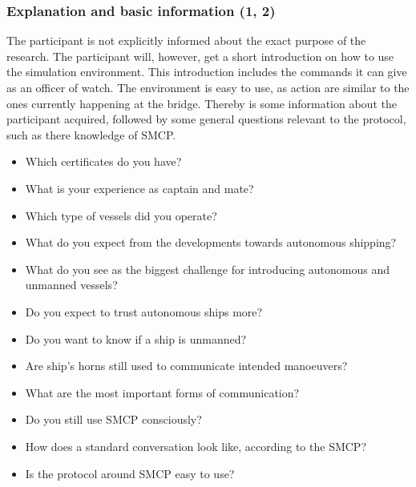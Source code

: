 \subsubsection{Explanation and basic information (1, 2)}
The participant is not explicitly informed about the exact purpose of the research. The participant will, however, get a short introduction on how to use the simulation environment. This introduction includes the commands it can give as an officer of watch. The environment is easy to use, as action are similar to the ones currently happening at the bridge. Thereby is some information about the participant acquired, followed by some general questions relevant to the protocol, such as there knowledge of \acf{SMCP}.
\begin{spacing}{1}
	\begin{itemize}
		\item Which certificates do you have? \participant
		\item What is your experience as captain and mate? \participant
		\item Which type of vessels did you operate? \participant
		\item What do you expect from the developments towards autonomous shipping? \participant \protocol
		\item What do you see as the biggest challenge for introducing autonomous and unmanned vessels? \participant \protocol
		\item Do you expect to trust autonomous ships more? \participant \trust
		\item Do you want to know if a ship is unmanned? \trust
		\item Are ship's horns still used to communicate intended manoeuvers? \protocol
		\item What are the most important forms of communication? \protocol
		\item Do you still use \ac{SMCP} consciously? \participant
		\item How does a standard conversation look like, according to the \ac{SMCP}? \participant \protocol
		\item Is the protocol around \ac{SMCP} easy to use? \protocol
	\end{itemize}
\end{spacing}

